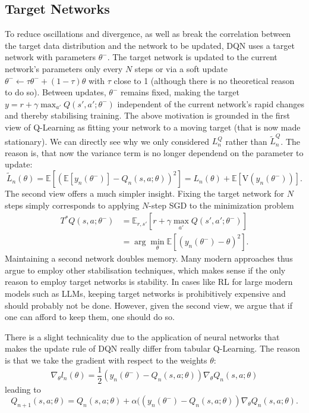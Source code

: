\documentclass[11pt,a4paper]{article}
\newcommand{\E}{\mathbb{E}}
\begin{document}
\subsection{Target Networks}
To reduce oscillations and divergence, as well as break the correlation between
the target data distribution and the network to be updated, DQN uses a target
network with parameters $\theta^-$. The target network is updated to the current
network's parameters only every $N$ steps or via a soft update
$\theta^-\leftarrow\tau\theta^-+(1-\tau)\theta$ with $\tau$ close to 1
(although there is no theoretical reason to do so). Between updates,
$\theta^-$ remains fixed, making the target
$y=r+\gamma\max_{a'}Q(s',a';\theta^-)$ independent of the current network's
rapid changes and thereby stabilising training. The above motivation is
grounded in the first view of Q-Learning as fitting your network to a moving
target (that is now made stationary). We can directly see why we only
considered $L_n^Q$ rather than $\widetilde L_n^Q$. The reason is, that now the
variance term is no longer dependend on the parameter to update:
\begin{equation}
 \widetilde L_n(\theta)
 =\E[(\E[y_n(\theta^-)]-Q_n(s,a;\theta))^2]
 =L_n(\theta)+\E[\mathrm V(y_n(\theta^-))].
\end{equation}
The second view offers a much simpler insight. Fixing the target network for
$N$ steps simply corresponds to applying $N$-step SGD to the minimization problem
\begin{equation}
 \begin{aligned}
 T^*Q(s,a;\theta^-)
 &=\E_{r,s'}\!\left[r+\gamma\max_{a'}Q(s',a';\theta^-)\right]\\
 &=\arg\min_\theta\E[(y_n(\theta^-)-\theta)^2].
 \end{aligned}
\end{equation}
Maintaining a second network doubles memory. Many modern approaches thus
argue to employ other stabilisation techniques, which makes sense if the only
reason to employ target networks is stability. In cases like RL for large modern
models such as LLMs, keeping target networks is prohibitively expensive and
should probably not be done. However, given the second view, we argue that if
one can afford to keep them, one should do so.

There is a slight technicality due to the application of neural networks that
makes the update rule of DQN really differ from tabular Q-Learning. The reason
is that we take the gradient with respect to the weights $\theta$:
\begin{equation}
 \nabla_\theta l_n(\theta)=\frac12
 (y_n(\theta^-)-Q_n(s,a;\theta))\nabla_\theta Q_n(s,a;\theta)
\end{equation}
leading to
\begin{equation}
 Q_{n+1}(s,a;\theta)=Q_n(s,a;\theta)+\alpha((y_n(\theta^-)-Q_n(s,a;\theta))
 \nabla_\theta Q_n(s,a;\theta).
\end{equation}
\end{document}
